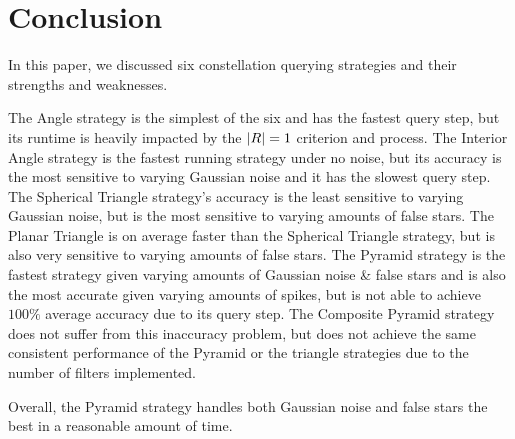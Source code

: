 \section{Conclusion}\label{sec:conclusion}
In this paper, we discussed six constellation querying strategies and their strengths and weaknesses.

The Angle strategy is the simplest of the six and has the fastest query step, but its runtime is heavily impacted by
the $\left| R \right| = 1$ criterion and  process.
The Interior Angle strategy is the fastest running strategy under no noise, but its accuracy is the most sensitive to
varying Gaussian noise and it has the slowest query step.
The Spherical Triangle strategy's accuracy is the least sensitive to varying Gaussian noise, but is the most sensitive
to varying amounts of false stars.
The Planar Triangle is on average faster than the Spherical Triangle strategy, but is also very sensitive to varying
amounts of false stars.
The Pyramid strategy is the fastest strategy given varying amounts of Gaussian noise \& false stars and is also the most
accurate given varying amounts of spikes, but is not able to achieve $100\%$ average accuracy due to its query step.
The Composite Pyramid strategy does not suffer from this inaccuracy problem, but does not achieve the same consistent
performance of the Pyramid or the triangle strategies due to the number of filters implemented.

Overall, the Pyramid strategy handles both Gaussian noise and false stars the best in a reasonable amount of time.
